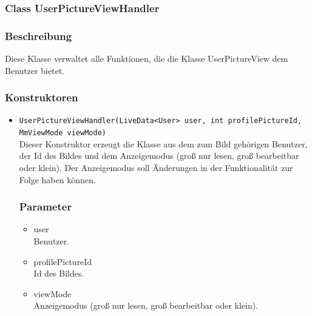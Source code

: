 \documentclass[a4paper]{scrreprt}
\begin{document}

\subsubsection{Class UserPictureViewHandler}
\subsubsection*{Beschreibung}
Diese Klasse verwaltet alle Funktionen, die die Klasse UserPictureView dem Benutzer bietet.

\subsubsection*{Konstruktoren}
\begin{addmargin}[25pt]{0pt}
\begin{itemize}

\item \texttt{UserPictureViewHandler(LiveData<User> user, int profilePictureId, MmViewMode viewMode)}\\
	Dieser Konstruktor erzeugt die Klasse aus dem zum Bild gehörigen Benutzer, der Id des Bildes und dem Anzeigemodus (groß nur lesen, groß bearbeitbar oder klein). Der Anzeigemodus soll Änderungen in der Funktionalität zur Folge haben können.

	\subsubsection*{Parameter}
	\begin{itemize}
	\item user \\
	Benutzer.
	\item profilePictureId \\
	Id des Bildes.
	\item viewMode \\
	Anzeigemodus (groß nur lesen, groß bearbeitbar oder klein).
	\end{itemize}

\end{itemize}
\end{addmargin}
\end{document}

